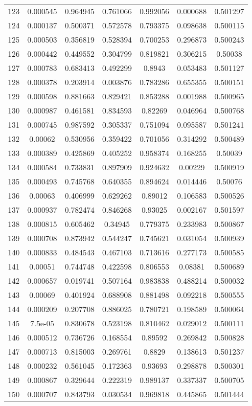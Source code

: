 \begin{table}
\begin{tabular}{c|c|c|c|c|c|c}
123 & 0.000545 & 0.964945 & 0.761066 & 0.992056 & 0.000688 & 0.501297\\
124 & 0.000137 & 0.500371 & 0.572578 & 0.793375 & 0.098638 & 0.500115\\
125 & 0.000503 & 0.356819 & 0.528394 & 0.700253 & 0.296873 & 0.500243\\
126 & 0.000442 & 0.449552 & 0.304799 & 0.819821 & 0.306215 & 0.50038\\
127 & 0.000783 & 0.683413 & 0.492299 & 0.8943 & 0.053483 & 0.501127\\
128 & 0.000378 & 0.203914 & 0.003876 & 0.783286 & 0.655355 & 0.500151\\
129 & 0.000598 & 0.881663 & 0.829421 & 0.853288 & 0.001988 & 0.500965\\
130 & 0.000987 & 0.461581 & 0.834593 & 0.82269 & 0.046964 & 0.500768\\
131 & 0.000745 & 0.987592 & 0.305337 & 0.751094 & 0.095587 & 0.501241\\
132 & 0.00062 & 0.530956 & 0.359422 & 0.701056 & 0.314292 & 0.500489\\
133 & 0.000389 & 0.425869 & 0.405252 & 0.958374 & 0.168255 & 0.50039\\
134 & 0.000584 & 0.733831 & 0.897909 & 0.924632 & 0.00229 & 0.500919\\
135 & 0.000493 & 0.745768 & 0.640355 & 0.894624 & 0.014446 & 0.50076\\
136 & 0.00063 & 0.406999 & 0.629262 & 0.89012 & 0.106583 & 0.500526\\
137 & 0.000937 & 0.782474 & 0.846268 & 0.93025 & 0.002167 & 0.501597\\
138 & 0.000815 & 0.605462 & 0.34945 & 0.779375 & 0.233983 & 0.500867\\
139 & 0.000708 & 0.873942 & 0.544247 & 0.745621 & 0.031054 & 0.500939\\
140 & 0.000833 & 0.484543 & 0.467103 & 0.713616 & 0.277173 & 0.500585\\
141 & 0.00051 & 0.744748 & 0.422598 & 0.806553 & 0.08381 & 0.500689\\
142 & 0.000657 & 0.019741 & 0.507164 & 0.983838 & 0.488214 & 0.500032\\
143 & 0.00069 & 0.401924 & 0.688908 & 0.881498 & 0.092218 & 0.500555\\
144 & 0.000209 & 0.207708 & 0.886025 & 0.780721 & 0.198589 & 0.500064\\
145 & 7.5e-05 & 0.830678 & 0.523198 & 0.810462 & 0.029012 & 0.500111\\
146 & 0.000512 & 0.736726 & 0.168554 & 0.89592 & 0.269842 & 0.500828\\
147 & 0.000713 & 0.815003 & 0.269761 & 0.8829 & 0.138613 & 0.501237\\
148 & 0.000232 & 0.561045 & 0.172363 & 0.93693 & 0.298878 & 0.500301\\
149 & 0.000867 & 0.329644 & 0.222319 & 0.989137 & 0.337337 & 0.500705\\
150 & 0.000707 & 0.843793 & 0.030534 & 0.969818 & 0.445865 & 0.501444\\
\end{tabular}
\end{table}
